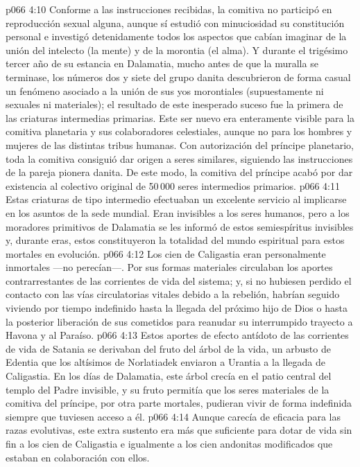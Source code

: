 \vs p066 4:10 Conforme a las instrucciones recibidas, la comitiva no participó en reproducción sexual alguna, aunque sí estudió con minuciosidad su constitución personal e investigó detenidamente todos los aspectos que cabían imaginar de la unión del intelecto (la mente) y de la morontia (el alma). Y durante el trigésimo tercer año de su estancia en Dalamatia, mucho antes de que la muralla se terminase, los números dos y siete del grupo danita descubrieron de forma casual un fenómeno asociado a la unión de sus yos morontiales (supuestamente ni sexuales ni materiales); el resultado de este inesperado suceso fue la primera de las criaturas intermedias primarias. Este ser nuevo era enteramente visible para la comitiva planetaria y sus colaboradores celestiales, aunque no para los hombres y mujeres de las distintas tribus humanas. Con autorización del príncipe planetario, toda la comitiva consiguió dar origen a seres similares, siguiendo las instrucciones de la pareja pionera danita. De este modo, la comitiva del príncipe acabó por dar existencia al colectivo original de 50\,000 seres intermedios primarios.
\vs p066 4:11 Estas criaturas de tipo intermedio efectuaban un excelente servicio al implicarse en los asuntos de la sede mundial. Eran invisibles a los seres humanos, pero a los moradores primitivos de Dalamatia se les informó de estos semiespíritus invisibles y, durante eras, estos constituyeron la totalidad del mundo espiritual para estos mortales en evolución.
\vs p066 4:12 Los cien de Caligastia eran personalmente inmortales ---no perecían---. Por sus formas materiales circulaban los aportes contrarrestantes de las corrientes de vida del sistema; y, si no hubiesen perdido el contacto con las vías circulatorias vitales debido a la rebelión, habrían seguido viviendo por tiempo indefinido hasta la llegada del próximo hijo de Dios o hasta la posterior liberación de sus cometidos para reanudar su interrumpido trayecto a Havona y al Paraíso.
\vs p066 4:13 Estos aportes de efecto antídoto de las corrientes de vida de Satania se derivaban del fruto del árbol de la vida, un arbusto de Edentia que los altísimos de Norlatiadek enviaron a Urantia a la llegada de Caligastia. En los días de Dalamatia, este árbol crecía en el patio central del templo del Padre invisible, y su fruto permitía que los seres materiales de la comitiva del príncipe, por otra parte mortales, pudieran vivir de forma indefinida siempre que tuviesen acceso a él.
\vs p066 4:14 Aunque carecía de eficacia para las razas evolutivas, este extra sustento era más que suficiente para dotar de vida sin fin a los cien de Caligastia e igualmente a los cien andonitas modificados que estaban en colaboración con ellos.
